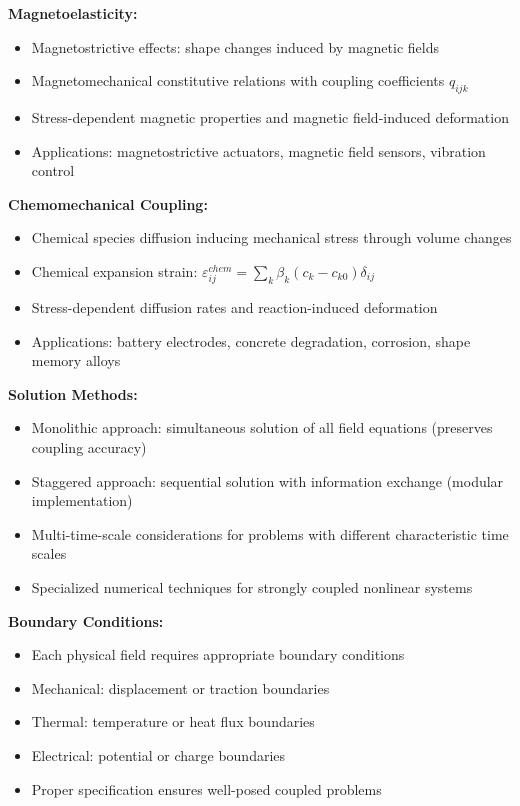 \begin{subox}[Summary]
\textbf{Magnetoelasticity:}
\begin{itemize}
\item Magnetostrictive effects: shape changes induced by magnetic fields
\item Magnetomechanical constitutive relations with coupling coefficients $q_{ijk}$
\item Stress-dependent magnetic properties and magnetic field-induced deformation
\item Applications: magnetostrictive actuators, magnetic field sensors, vibration control
\end{itemize}

\textbf{Chemomechanical Coupling:}
\begin{itemize}
\item Chemical species diffusion inducing mechanical stress through volume changes
\item Chemical expansion strain: $\varepsilon_{ij}^{chem} = \sum_k \beta_k (c_k - c_{k0}) \delta_{ij}$
\item Stress-dependent diffusion rates and reaction-induced deformation
\item Applications: battery electrodes, concrete degradation, corrosion, shape memory alloys
\end{itemize}

\textbf{Solution Methods:}
\begin{itemize}
\item Monolithic approach: simultaneous solution of all field equations (preserves coupling accuracy)
\item Staggered approach: sequential solution with information exchange (modular implementation)
\item Multi-time-scale considerations for problems with different characteristic time scales
\item Specialized numerical techniques for strongly coupled nonlinear systems
\end{itemize}

\textbf{Boundary Conditions:}
\begin{itemize}
\item Each physical field requires appropriate boundary conditions
\item Mechanical: displacement or traction boundaries
\item Thermal: temperature or heat flux boundaries
\item Electrical: potential or charge boundaries
\item Proper specification ensures well-posed coupled problems
\end{itemize}


\end{subox}
